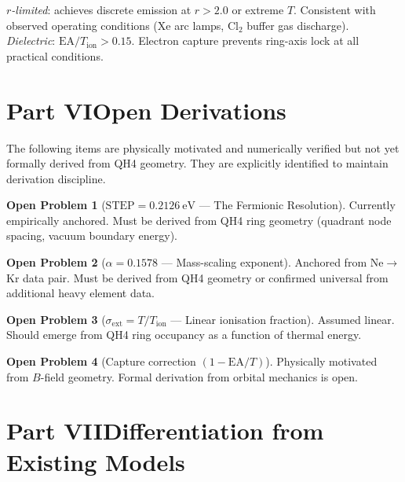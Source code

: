 \documentclass[12pt,a4paper]{article}
\theoremstyle{definition}
\newtheorem{openprob}{Open Problem}[section]
\begin{document}
\textit{$r$-limited}: achieves discrete emission at $r > 2.0$ or extreme $T$. Consistent with observed operating conditions (Xe arc lamps, Cl$_{2}$ buffer gas discharge).\\
\textit{Dielectric}: $\mathrm{EA}/T_{\mathrm{ion}} > 0.15$. Electron capture prevents ring-axis lock at all practical conditions.

\part*{Part VI\quad Open Derivations}

The following items are physically motivated and numerically verified but not yet formally derived from QH4 geometry. They are explicitly identified to maintain derivation discipline.

\begin{openprob}[$\mathrm{STEP} = 0.2126\ \mathrm{eV}$ --- The Fermionic Resolution]
Currently empirically anchored. Must be derived from QH4 ring geometry (quadrant node spacing, vacuum boundary energy).
\end{openprob}

\begin{openprob}[$\alpha = 0.1578$ --- Mass-scaling exponent]
Anchored from Ne$\to$Kr data pair. Must be derived from QH4 geometry or confirmed universal from additional heavy element data.
\end{openprob}

\begin{openprob}[$\sigma_{\mathrm{ext}} = T/T_{\mathrm{ion}}$ --- Linear ionisation fraction]
Assumed linear. Should emerge from QH4 ring occupancy as a function of thermal energy.
\end{openprob}

\begin{openprob}[Capture correction $(1 - \mathrm{EA}/T)$]
Physically motivated from $B$-field geometry. Formal derivation from orbital mechanics is open.
\end{openprob}

\part*{Part VII\quad Differentiation from Existing Models}
\end{document}
